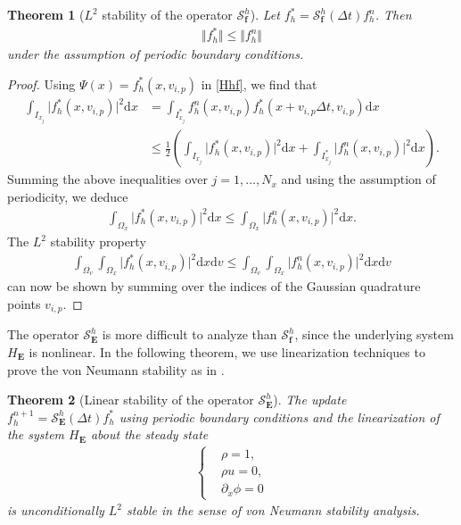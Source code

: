 \documentclass[letterpaper,10pt]{article}
\newtheorem{theorem}{Theorem}[section]
\numberwithin{equation}{section}
\numberwithin{figure}{section}
\numberwithin{table}{section}
\begin{document}
\begin{theorem}[$L^2$ stability of the operator $\mathcal{S}_{\mathbf{f}}^h$]
Let $f_h^*=\mathcal{S}_{\mathbf{f}}^h(\Delta t)f_h^n$. Then 
\begin{align*}
    \Vert f_h^{*}\Vert\leq \Vert f_h^n\Vert
\end{align*}
under the assumption of periodic boundary conditions.
\end{theorem}
\begin{proof}
Using $\Psi(x)=f_h^{*}(x,v_{i,p})$ in \eqref{Hhf}, we find that
\begin{align*}
    \int_{I_{x_j}}\vert f_h^{*}(x,v_{i,p})\vert^2\mathrm dx&=\int_{I_{x_j}^*}f_h^n(x,v_{i,p})f_h^{*}(x+v_{i,p}\Delta t,v_{i,p})\mathrm dx\\
    & \leq \frac{1}{2}\left(\int_{I_{x_j}}\vert f_h^*(x,v_{i,p})\vert^2\mathrm dx+ \int_{I_{x_j}^*}\vert f_h^n(x,v_{i,p})\vert^2\mathrm dx \right).
\end{align*}
Summing the above inequalities over $j=1,\ldots,N_x$ and using the assumption
of periodicity, we deduce
\begin{align*}
    \int_{\Omega_x}\vert f_h^{*}(x,v_{i,p})\vert^2\mathrm dx\leq \int_{\Omega_x}\vert f_h^n(x,v_{i,p})\vert^2\mathrm dx.
\end{align*}
The $L^2$ stability property
\begin{align*}
    \int_{\Omega_v}\int_{\Omega_x}\vert f_h^{*}(x,v_{i,p})\vert^2\mathrm dx\mathrm dv\leq \int_{\Omega_v}\int_{\Omega_x}\vert f_h^n(x,v_{i,p})\vert^2\mathrm dx\mathrm dv
\end{align*}
can now be shown by summing over the indices of the Gaussian quadrature points $v_{i,p}$.
\end{proof}
The operator $\mathcal{S}_{\mathbf{E}}^h$ is more difficult to analyze 
than $\mathcal{S}_{\mathbf{f}}^h$, since the underlying system $H_{\mathbf E}$ is
nonlinear. In the following theorem, we use linearization techniques to prove
the von Neumann stability as in \cite{Degond2008,Crou2016}.
\begin{theorem}[Linear stability of the operator $\mathcal{S}_{\mathbf{E}}^h$]
 The update $f_h^{n+1}=\mathcal{S}_{\mathbf{E}}^h(\Delta t)f_h^*$ using
 periodic boundary conditions and the linearization
 of the system $H_{\mathbf E}$ about the steady state
\begin{align*}
    \left\{
        \begin{aligned}
            &\rho=1,\\
            &\rho u=0,\\
            &\partial_x\phi=0
        \end{aligned}
    \right.
\end{align*}
is unconditionally $L^2$ stable in the sense of von Neumann stability analysis.
\end{theorem}
\end{document}

